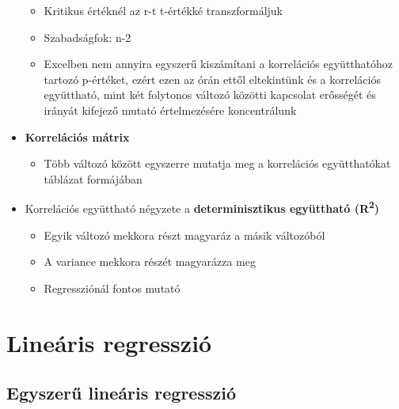 \documentclass[
  letterpaper,
  DIV=11,
  numbers=noendperiod]{scrreprt}
\providecommand{\tightlist}{%
  \setlength{\itemsep}{0pt}\setlength{\parskip}{0pt}}\usepackage{longtable,booktabs,array}
\begin{document}
\begin{itemize}
  \begin{itemize}
  \item
    Kritikus értéknél az r-t t-értékké transzformáljuk
  \item
    Szabadságfok: n-2
  \item
    Excelben nem annyira egyszerű kiszámítani a korrelációs
    együtthatóhoz tartozó p-értéket, ezért ezen az órán ettől
    eltekintünk és a korrelációs együttható, mint két folytonos változó
    közötti kapcsolat erősségét és irányát kifejező mutató értelmezésére
    koncentrálunk
  \end{itemize}
\item
  \textbf{Korrelációs mátrix}

  \begin{itemize}
  \tightlist
  \item
    Több változó között egyszerre mutatja meg a korrelációs
    együtthatókat táblázat formájában
  \end{itemize}
\item
  Korrelációs együttható négyzete a \textbf{determinisztikus együttható
  (R\textsuperscript{2})}

  \begin{itemize}
  \item
    Egyik változó mekkora részt magyaráz a másik változóból
  \item
    A variance mekkora részét magyarázza meg
  \item
    Regressziónál fontos mutató
  \end{itemize}
\end{itemize}


\hypertarget{lineuxe1ris-regressziuxf3}{%
\chapter{Lineáris regresszió}\label{lineuxe1ris-regressziuxf3}}

\hypertarget{egyszerux171-lineuxe1ris-regressziuxf3}{%
\section{Egyszerű lineáris
regresszió}\label{egyszerux171-lineuxe1ris-regressziuxf3}}
\end{document}
